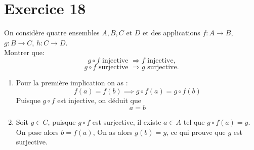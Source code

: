 \documentclass{report}
\begin{document}


\section{Exercice 18}
\qs{}
{
On consid\`ere quatre ensembles $A,B,C$ et $D$ et des applications $f:A\rightarrow B$, $g:B\rightarrow
C$, $h:C\rightarrow D$.\\
Montrer que:
$$g\circ f\text{ injective } \Rightarrow f\text{ injective,}$$
$$g\circ f\text{ surjective } \Rightarrow g\text{ surjective.}$$
}

\begin{myproof}
  \begin{enumerate}
    \item Pour la première implication on as :
      $$
      f(a) = f(b) \implies g\circ f(a) = g\circ f(b)
      $$
      Puisque $g\circ f$ est injective, on déduit que 
      $$
      a = b
      $$
    \item Soit $y\in C$, puisque $g\circ f$ est surjective, il existe $a\in A$
      tel que $g\circ f(a) = y$. \\

On pose alors $b = f(a)$, On as alors $g(b) = y$, ce qui prouve que $g$ est
surjective.

  \end{enumerate}
\end{myproof}



\end{document}

